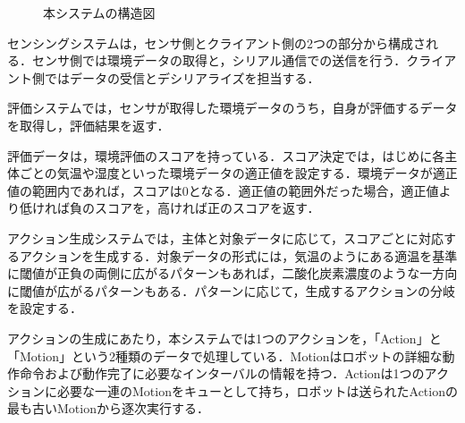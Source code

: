 \documentclass[paper=a4paper,jafontsize=9pt,head_space=15mm,gutter=20mm,
twocolumn,number_of_lines=49, line_length=26zw]{myuarticle}
\begin{document}
\fboxsep=0pt            %
\fboxrule=1pt            %
\begin{figure}[h]
  \centering
  \caption{本システムの構造図}
  \label{fig:system-structure}
\end{figure}

センシングシステムは，センサ側とクライアント側の2つの部分から構成される．センサ側では環境データの取得と，シリアル通信での送信を行う．クライアント側ではデータの受信とデシリアライズを担当する．

評価システムでは，センサが取得した環境データのうち，自身が評価するデータを取得し，評価結果を返す．

評価データは，環境評価のスコアを持っている．スコア決定では，はじめに各主体ごとの気温や湿度といった環境データの適正値を設定する．環境データが適正値の範囲内であれば，スコアは0となる．適正値の範囲外だった場合，適正値より低ければ負のスコアを，高ければ正のスコアを返す．

アクション生成システムでは，主体と対象データに応じて，スコアごとに対応するアクションを生成する．対象データの形式には，気温のようにある適温を基準に閾値が正負の両側に広がるパターンもあれば，二酸化炭素濃度のような一方向に閾値が広がるパターンもある．パターンに応じて，生成するアクションの分岐を設定する．

アクションの生成にあたり，本システムでは1つのアクションを，「Action」と「Motion」という2種類のデータで処理している．Motionはロボットの詳細な動作命令および動作完了に必要なインターバルの情報を持つ．Actionは1つのアクションに必要な一連のMotionをキューとして持ち，ロボットは送られたActionの最も古いMotionから逐次実行する．
\end{document}
